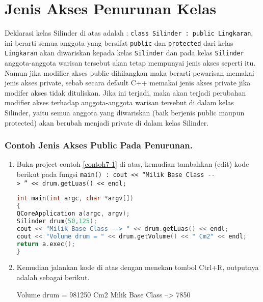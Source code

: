 \section{Jenis Akses Penurunan Kelas}\label{jenis-akses-penurunan-kelas}

Deklarasi kelas Silinder di atas adalah :
\texttt{class\ Silinder\ :\ public\ Lingkaran}, ini berarti semua
anggota yang bersifat \texttt{public} dan \texttt{protected} dari kelas
\texttt{Lingkaran} akan diwariskan kepada kelas \texttt{Silinder} dan
pada kelas \texttt{Silinder} anggota-anggota warisan tersebut akan tetap
mempunyai jenis akses seperti itu. Namun jika modifier akses public
dihilangkan maka berarti pewarisan memakai jenis akses private, sebab
secara default C++ memakai jenis akses private jika modifer akses tidak
dituliskan. Jika ini terjadi, maka akan terjadi perubahan modifier akses
terhadap anggota-anggota warisan tersebut di dalam kelas Silinder, yaitu
semua anggota yang diwariskan (baik berjenis public maupun protected)
akan berubah menjadi private di dalam kelas Silinder.

\subsubsection*{Contoh  Jenis Akses Public Pada Penurunan.}

\begin{enumerate}

\item Buka project contoh \ref{contoh7-1} di atas, kemudian tambahkan (edit) kode berikut
pada fungsi
\texttt{main()\ :\ cout\ \textless{}\textless{}\ ``Milik\ Base\ Class\ -\/-\textgreater{}\ ''\ \textless{}\textless{}\ drum.getLuas()\ \textless{}\textless{}\ endl;}

\begin{lstlisting}[language=c++, caption=Jenis Akses Public Pada Penurunan, label=contoh7-2]
int main(int argc, char *argv[])
{
QCoreApplication a(argc, argv);
Silinder drum(50,125);
cout << "Milik Base Class --> " << drum.getLuas() << endl;
cout << "Volume drum = " << drum.getVolume() << " Cm2" << endl;
return a.exec();
}
\end{lstlisting}

\item Kemudian jalankan kode di atas dengan menekan tombol Ctrl+R, outputnya
adalah sebagai berikut.
\begin{lcverbatim}
Volume drum = 981250 Cm2
Milik Base Class --> 7850
\end{lcverbatim}
\end{enumerate}

